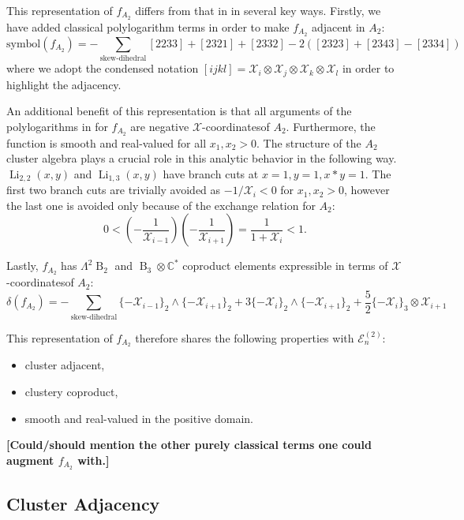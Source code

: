\documentclass[11pt]{article}
\DeclareMathOperator{\B}{B}
\DeclareMathOperator{\Li}{Li}
\def\x{\mathcal{X}}
\def\xcoords{$\mathcal{X}$-coordinates}
\def\draftnote#1{{\bf [#1]}}
\begin{document}
This representation of $f_{A_2}$ differs from that in \cite{Golden:2014xqa} in several key ways. Firstly, we have added classical polylogarithm terms in order to make $f_{A_2}$ adjacent in $A_2$:
\begin{equation}
   \text{symbol}(f_{A_2}) = -\sum_{\text{skew-dihedral}}[2233]+[2321]+[2332]-2([2323]+[2343]-[2334])
\end{equation}
where we adopt the condensed notation $[ijkl] = \x_i\otimes\x_j\otimes\x_k\otimes\x_l$ in order to highlight the adjacency. 

An additional benefit of this representation is that all arguments of the polylogarithms in for $f_{A_2}$ are negative \xcoords of $A_2$. Furthermore, the function is smooth and real-valued for all $x_1, x_2>0$. The structure of the $A_2$ cluster algebra plays a crucial role in this analytic behavior in the following way. $\Li_{2,2}(x,y)$ and $\Li_{1,3}(x,y)$ have branch cuts at $x=1,y=1, x*y=1$. The first two branch cuts are trivially avoided as $-1/\x_i<0$ for $x_1,x_2>0$, however the last one is avoided only because of the exchange relation for $A_2$: 
\begin{equation}
	0<\left(-\frac{1}{\x_{i-1}}\right)\left(-\frac{1}{\x_{i+1}}\right) = \frac{1}{1+\x_i}<1.
\end{equation}

Lastly, $f_{A_2}$ has $\Lambda^2\B_2$ and $\B_3 \otimes \mathbb{C}^*$ coproduct elements expressible in terms of \xcoords of $A_2$:
\begin{equation}
	\delta\left(f_{A_2}\right) = -\sum_{\text{skew-dihedral}} \{-\x_{i-1}\}_2 \wedge \{-\x_{i+1}\}_2 + 3\{-\x_{i}\}_2 \wedge \{-\x_{i+1}\}_2 + \frac{5}{2}\{-\x_{i}\}_3 \otimes \x_{i+1}
\end{equation}

This representation of $f_{A_2}$ therefore shares the following properties with $\mathcal{E}^{(2)}_n$:
\begin{itemize}
	\item cluster adjacent,
	\item clustery coproduct,
	\item smooth and real-valued in the positive domain.
\end{itemize}

\draftnote {Could/should mention the other purely classical terms one could augment $f_{A_2}$ with.}

\subsection{Cluster Adjacency}
\end{document}
